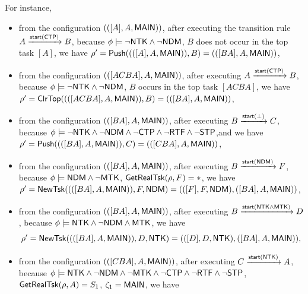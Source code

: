 \begin{example}
For instance,
        \begin{itemize}
        \item from the configuration $(([A], A, {\sf MAIN}))$, after executing the transition rule $A \xrightarrow{{\mathsf{start} }({\sf CTP})} B$, because $\phi \models \neg {\sf NTK} \wedge \neg {\sf NDM}$, $B$ does not occur in the top task $[A]$, we have $\rho' = \mathsf{Push}((([A], A, {\sf MAIN})), B) = (([BA], A, {\sf MAIN}))$, 
        \item from the configuration $(([ACBA], A, {\sf MAIN}))$, after executing $A \xrightarrow{{\mathsf{start} }({\sf CTP})} B$, because $\phi \models \neg {\sf NTK} \wedge \neg {\sf NDM}$, $B$ occurs in the top task $[ACBA]$, we have $\rho' = \mathsf{ClrTop}((([ACBA], A, {\sf MAIN})), B) = (([BA], A, {\sf MAIN}))$, 
	\item from the configuration $(([BA], A, {\sf MAIN}))$, after executing $B\xrightarrow{{\mathsf{start} }(\bot)}C$, because $\phi\models\neg{\sf NTK}\wedge\neg{\sf NDM}\wedge\neg{\sf CTP}\wedge\neg{\sf RTF}\wedge\neg{\sf STP}$,and we have $\rho' = \mathsf{Push}((([BA], A, {\sf MAIN})), C) = (([CBA], A, {\sf MAIN}))$, 
	\item from the configuration $(([BA], A, {\sf MAIN}))$, after executing $B\xrightarrow{{\mathsf{start} }({\sf NDM})}F$, because $\phi \models {\sf NDM}\wedge\neg{\sf MTK}$, $\mathsf{GetRealTsk}(\rho,F) = *$,  we have 
	$\rho' = \mathsf{NewTsk}((([BA], A, {\sf MAIN})), F, {\sf NDM}) = (([F], F, {\sf NDM}),([BA], A, {\sf MAIN}))$, 
		\item from the configuration $(([BA], A, {\sf MAIN}))$, after executing $B\xrightarrow{{\mathsf{start} }({\sf NTK}\wedge{\sf MTK})}D$, because $\phi\models{\sf NTK}\wedge\neg{\sf NDM}\wedge{\sf MTK}$, we have 
		$$\rho' = \mathsf{NewTsk}((([BA], A, {\sf MAIN})), D, {\sf NTK}) = (([D],D,{\sf NTK}),([BA], A, {\sf MAIN})),$$ 
        \item from the configuration $(([CBA], A, {\sf MAIN}))$, after executing $C \xrightarrow{{\mathsf{start} }({\sf NTK})} A$, because 
        $\phi\models{\sf NTK}\wedge\neg{\sf NDM}\wedge\neg{\sf MTK}\wedge\neg{\sf CTP}\wedge\neg{\sf RTF}\wedge\neg{\sf STP}$, $\mathsf{GetRealTsk}(\rho,A) = S_1$, $\zeta_1 = {\sf MAIN}$, we have 

\end{itemize}
\end{example}
